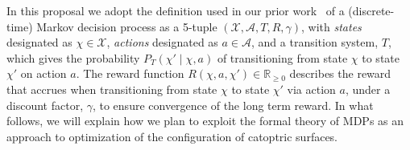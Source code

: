 In this proposal we adopt the definition used in our prior work~\cite{gtsg08}
of a (discrete-time) Markov decision process as a 5-tuple
$(\mathcal{X}, \mathcal{A}, T, R, \gamma)$, with \emph{states} designated
as $\chi \in \mathcal{X}$, \emph{actions} designated as $a \in \mathcal{A}$,
and a transition system, $T$, which gives the probability
$P_T (\chi' \mid \chi, a)$ of transitioning from state $\chi$ to
state $\chi'$ on action $a$.
The reward function $R(\chi, a, \chi') \in \mathbb R_{\ge 0}$ describes the
reward that accrues when transitioning from state $\chi$ to
state $\chi'$ via action $a$, under a discount factor, $\gamma$,
to ensure convergence of the long term reward.
In what follows, we will explain how we plan to exploit the formal theory of 
MDPs as an approach to optimization of the configuration of catoptric surfaces.


